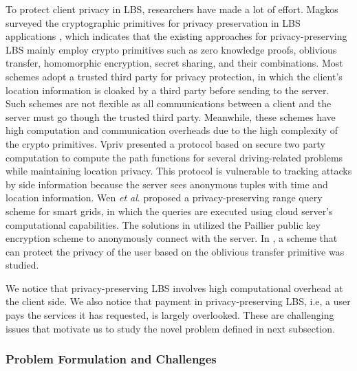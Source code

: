\documentclass[letterpaper,12pt]{article}
\begin{document}
To protect client privacy in LBS, researchers have made a lot of effort.  Magkos surveyed the cryptographic primitives for privacy preservation in LBS applications \cite{magkos2011cryptographic}, which indicates that the existing approaches for privacy-preserving LBS  mainly employ crypto primitives such as zero knowledge proofs, oblivious transfer, homomorphic encryption, secret sharing, and their combinations. Most schemes \cite{mokbel2006new,jorns2007privacy,khoshgozaran2007blind} adopt a trusted third party for privacy protection, in which the client's location information is cloaked by a third party before sending to the server. Such schemes are not flexible as all communications between a client and the server must go though the trusted third party. Meanwhile, these schemes have high computation and communication overheads due to the high complexity of the crypto primitives. Vpriv \cite{popa2009vpriv} presented a protocol based on secure two party computation to compute the path functions for several driving-related problems while maintaining location privacy. This protocol is vulnerable to tracking attacks by side information because the server sees anonymous tuples with time and location information. Wen \emph{et al}.  \cite{wen2013parq} proposed a privacy-preserving range query scheme for smart grids, in which the queries are executed using cloud server's computational capabilities. The solutions in \cite{zhong2008toward} utilized the Paillier public key encryption scheme to anonymously connect with the server. In \cite{zhong2009distributed}, a scheme that can protect the privacy of the user based on the oblivious transfer primitive \cite{blake2004strong} was studied.

We notice that privacy-preserving LBS involves high computational overhead at the client side. We also notice that payment in privacy-preserving LBS, i.e, a user pays the services it has requested, is largely overlooked. These are challenging issues that motivate us to study the novel problem defined in next subsection.



\subsubsection{Problem Formulation and Challenges}
\end{document}
